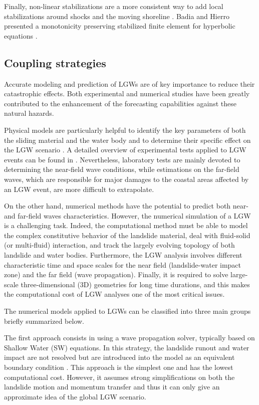 Finally, non-linear stabilizations are a more consistent way to add local stabilizations around shocks and the moving shoreline \cite{codina2011}. Badia and Hierro presented a monotonicity preserving stabilized finite element for hyperbolic equations \cite{badia2014}.



\subsection{Coupling strategies}


Accurate modeling and prediction of LGWs are of key importance to reduce their catastrophic effects.
Both experimental and numerical studies have been greatly contributed to the enhancement of the forecasting capabilities against these natural hazards.

Physical models are particularly helpful to identify the key parameters of both the sliding material and the water body and to determine their specific effect on the LGW scenario \cite{noda1970water, fritz2004near, heller2011wave, mohammed2012physical, romano2016, mulligan2017, evers2019spatial}. A detailed overview of experimental tests applied to LGW events can be found in \cite{yavari2017subaerial}. Nevertheless, laboratory tests are mainly devoted to determining the near-field wave conditions, while estimations on the far-field waves, which are responsible for major damages to the coastal areas affected by an LGW event, are more difficult to extrapolate.

On the other hand, numerical methods have the potential to predict both near- and far-field waves characteristics. However, the numerical simulation of a LGW is a challenging task. Indeed, the computational method must be able to model the complex constitutive behavior of the landslide material, deal with fluid-solid (or multi-fluid) interaction, and track the largely evolving topology of both landslide and water bodies. Furthermore, the LGW analysis involves different characteristic time and space scales for the near field (landslide-water impact zone) and the far field (wave propagation). Finally, it is required to solve large-scale three-dimensional (3D) geometries for long time durations, and this makes the computational cost of LGW analyses one of the most critical issues.

The numerical models applied to LGWs can be classified into three main groups \cite{yavari2016numerical} briefly summarized below.

The first approach consists in using a wave propagation solver, typically based on Shallow Water (SW) equations. In this strategy, the landslide runout and water impact are not resolved but are introduced into the model as an equivalent boundary condition \cite{waythomas2003numerical, ataie2008mapping}. This approach is the simplest one and has the lowest computational cost. However, it assumes strong simplifications on both the landslide motion and momentum transfer and thus it can only give an approximate idea of the global LGW scenario.

